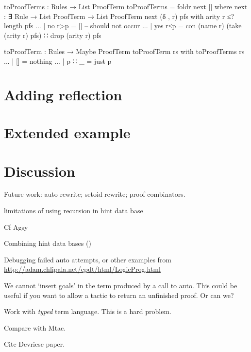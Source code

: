 \documentclass[preprint]{sigplanconf}
\begin{document}
\begin{code}
toProofTerms : Rules → List ProofTerm
toProofTerms = foldr next []
  where
    next : ∃ Rule → List ProofTerm → List ProofTerm
    next (δ , r) pfs with arity r ≤? length pfs
    ... | no   r>p = [] -- should not occur
    ... | yes  r≤p =
      con (name r) (take (arity r) pfs) ∷ drop (arity r) pfs
\end{code}

\begin{code}
toProofTerm : Rules → Maybe ProofTerm
toProofTerm rs with toProofTerms rs
... | []     = nothing
... | p ∷ _  = just p
\end{code}


\section{Adding reflection}
\label{sec:reflection}


\section{Extended example}
\label{sec:example}


\section{Discussion}
\label{sec:discussion}



Future work: auto rewrite; setoid rewrite; proof combinators.

limitations of using recursion in hint data base

Cf Agsy



Combining hint data bases ()

Debugging failed auto attempts, or other examples from
\url{http://adam.chlipala.net/cpdt/html/LogicProg.html}

We cannot `insert goals' in the term produced by a call to auto. This
could be useful if you want to allow a tactic to return an unfinished
proof. Or can we? 

Work with \emph{typed} term language. This is a hard problem.

Compare with Mtac.

Cite Devriese paper.



\end{document}
